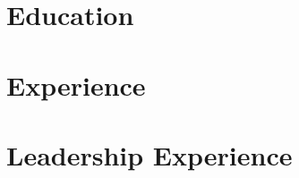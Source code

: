 \documentclass[letterpaper,11pt]{article}
\begin{document}
\section{Education}
    \resumeSubHeadingListStart
    \resumeSubheading
    {}{}
    {}{}
    \resumeSubHeadingListEnd


\section{Experience}
\resumeSubHeadingListStart
    \resumeSubheading
    {}{}
    {}{}
\resumeSubHeadingListEnd






\section{Leadership Experience}
\resumeSubHeadingListStart
    \resumeSubheading
    {}{}
    {}{}
\resumeSubHeadingListEnd

\end{document}
